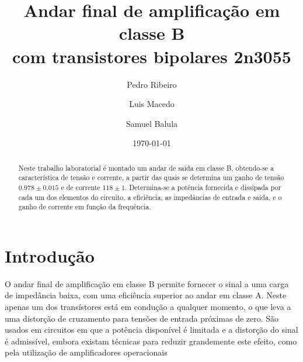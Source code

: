 \documentclass[%
  reprint,
  nofootinbib,
  amsmath,amssymb,
  aps,
  10pt,
  a4paper
]{revtex4-1}
\begin{document}


 

\title{Andar final de amplificação em classe B\\
com transistores bipolares 2n3055}

\author{Pedro Ribeiro}%
\author{Luis Macedo}%
\author{Samuel Balula}%



\date{\today}

\begin{abstract}
Neste trabalho laboratorial é montado um andar de saída em classe B, obtendo-se a característica de tensão e corrente, a partir das quais se determina um ganho de tensão $0.978\pm0.015$ e de corrente $118\pm1$. Determina-se a potência fornecida e dissipada por cada um dos elementos do circuito, a eficiência, as impedâncias de entrada e saída, e o ganho de corrente em função da frequência.

\end{abstract}
\maketitle


\section{Introdução}
\label{s:intro}
O andar final de amplificação em classe B permite fornecer o sinal a uma carga de impedância baixa, com uma eficiência superior ao andar em classe A. Neste apenas um dos transístores está em condução a qualquer momento, o que leva a uma distorção de cruzamento para tensões de entrada próximas de zero. São usados em circuitos em que a potência disponível é limitada e a distorção do sinal é admissível, embora existam técnicas para reduzir grandemente este efeito, como pela utilização de amplificadores operacionais
\end{document}
